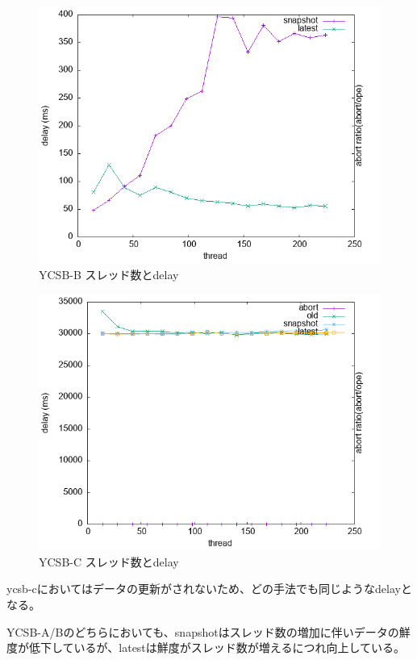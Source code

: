 \documentclass[a4paper]{jreport}	%
\begin{document}
\begin{figure}[h] 
\centering
\includegraphics[width=15cm]{data/stable/ycsb-b/delay2}
\caption{YCSB-B スレッド数とdelay}
\label{fig:delay-b2}
\end{figure}

\begin{figure}[h] 
\centering
\includegraphics[width=15cm]{data/stable/ycsb-c/delay}
\caption{YCSB-C スレッド数とdelay}
\label{fig:delay-c}
\end{figure}

ycsb-cにおいてはデータの更新がされないため、どの手法でも同じようなdelayとなる。

YCSB-A/Bのどちらにおいても、snapshotはスレッド数の増加に伴いデータの鮮度が低下しているが、latestは鮮度がスレッド数が増えるにつれ向上している。
\end{document}
